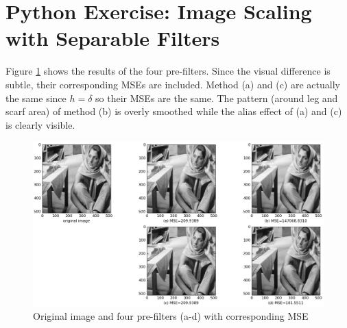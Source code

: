 \section{Python Exercise: Image Scaling with Separable Filters}\label{sec:p7}

Figure \ref{fig:p7} shows the results of the four pre-filters. Since the visual difference is subtle, their corresponding MSEs are included. Method (a) and (c) are actually the same since $h = \delta$ so their MSEs are the same. The pattern (around leg and scarf area) of method (b) is overly smoothed while the alias effect of (a) and (c) is clearly visible.

\begin{figure}[htbp]
	\centering
	\includegraphics[width=\textwidth]{images/p7}
	\caption{Original image and four pre-filters (a-d) with corresponding MSE}
	\label{fig:p7}
\end{figure}